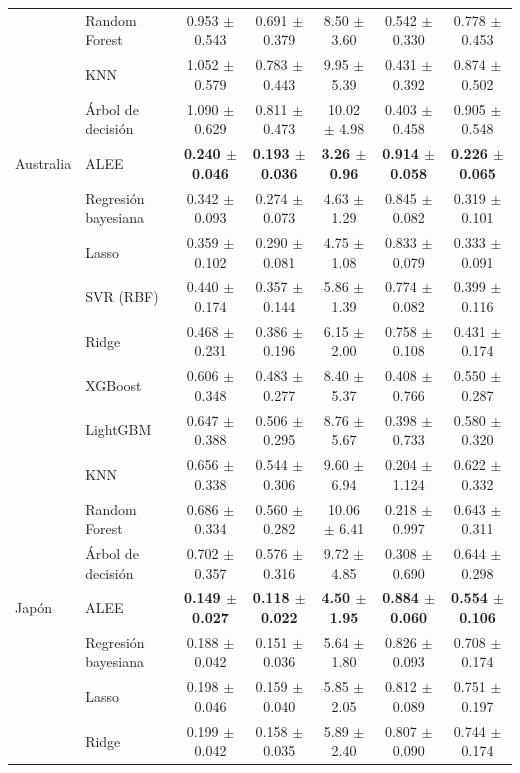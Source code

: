 \begin{longtable}{llccccc}
 & Random Forest & 0.953 $\pm$ 0.543 & 0.691 $\pm$ 0.379 & 8.50 $\pm$ 3.60 & 0.542 $\pm$ 0.330 & 0.778 $\pm$ 0.453 \\
 & KNN & 1.052 $\pm$ 0.579 & 0.783 $\pm$ 0.443 & 9.95 $\pm$ 5.39 & 0.431 $\pm$ 0.392 & 0.874 $\pm$ 0.502 \\
 & Árbol de decisión & 1.090 $\pm$ 0.629 & 0.811 $\pm$ 0.473 & 10.02 $\pm$ 4.98 & 0.403 $\pm$ 0.458 & 0.905 $\pm$ 0.548 \\
\midrule
Australia & ALEE & \textbf{0.240 $\pm$ 0.046} & \textbf{0.193 $\pm$ 0.036} & \textbf{3.26 $\pm$ 0.96} & \textbf{0.914 $\pm$ 0.058} & \textbf{0.226 $\pm$ 0.065} \\
 & Regresión bayesiana & 0.342 $\pm$ 0.093 & 0.274 $\pm$ 0.073 & 4.63 $\pm$ 1.29 & 0.845 $\pm$ 0.082 & 0.319 $\pm$ 0.101 \\
 & Lasso & 0.359 $\pm$ 0.102 & 0.290 $\pm$ 0.081 & 4.75 $\pm$ 1.08 & 0.833 $\pm$ 0.079 & 0.333 $\pm$ 0.091 \\
 & SVR (RBF) & 0.440 $\pm$ 0.174 & 0.357 $\pm$ 0.144 & 5.86 $\pm$ 1.39 & 0.774 $\pm$ 0.082 & 0.399 $\pm$ 0.116 \\
 & Ridge & 0.468 $\pm$ 0.231 & 0.386 $\pm$ 0.196 & 6.15 $\pm$ 2.00 & 0.758 $\pm$ 0.108 & 0.431 $\pm$ 0.174 \\
 & XGBoost & 0.606 $\pm$ 0.348 & 0.483 $\pm$ 0.277 & 8.40 $\pm$ 5.37 & 0.408 $\pm$ 0.766 & 0.550 $\pm$ 0.287 \\
 & LightGBM & 0.647 $\pm$ 0.388 & 0.506 $\pm$ 0.295 & 8.76 $\pm$ 5.67 & 0.398 $\pm$ 0.733 & 0.580 $\pm$ 0.320 \\
 & KNN & 0.656 $\pm$ 0.338 & 0.544 $\pm$ 0.306 & 9.60 $\pm$ 6.94 & 0.204 $\pm$ 1.124 & 0.622 $\pm$ 0.332 \\
 & Random Forest & 0.686 $\pm$ 0.334 & 0.560 $\pm$ 0.282 & 10.06 $\pm$ 6.41 & 0.218 $\pm$ 0.997 & 0.643 $\pm$ 0.311 \\
 & Árbol de decisión & 0.702 $\pm$ 0.357 & 0.576 $\pm$ 0.316 & 9.72 $\pm$ 4.85 & 0.308 $\pm$ 0.690 & 0.644 $\pm$ 0.298 \\
\midrule
Japón & ALEE & \textbf{0.149 $\pm$ 0.027} & \textbf{0.118 $\pm$ 0.022} & \textbf{4.50 $\pm$ 1.95} & \textbf{0.884 $\pm$ 0.060} & \textbf{0.554 $\pm$ 0.106} \\
 & Regresión bayesiana & 0.188 $\pm$ 0.042 & 0.151 $\pm$ 0.036 & 5.64 $\pm$ 1.80 & 0.826 $\pm$ 0.093 & 0.708 $\pm$ 0.174 \\
 & Lasso & 0.198 $\pm$ 0.046 & 0.159 $\pm$ 0.040 & 5.85 $\pm$ 2.05 & 0.812 $\pm$ 0.089 & 0.751 $\pm$ 0.197 \\
 & Ridge & 0.199 $\pm$ 0.042 & 0.158 $\pm$ 0.035 & 5.89 $\pm$ 2.40 & 0.807 $\pm$ 0.090 & 0.744 $\pm$ 0.174 \\

\end{longtable}
